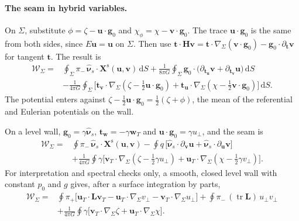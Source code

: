\documentclass[11pt]{article}
\theoremstyle{definition}
\theoremstyle{remark}
\newcommand{\bu}{\mathbf{u}}
\newcommand{\bv}{\mathbf{v}}
\newcommand{\bw}{\mathbf{w}}
\newcommand{\dS}{\,\mathrm{d}S}
\newcommand{\nuhs}{\hat{\boldsymbol{\nu}}_s}
\begin{document}
\paragraph{The seam in hybrid variables.} On $\Sigma$, substitute
$\phi = \zeta - \bu\cdot\mathbf g_0$ and $\chi_\phi = \chi -
\bv\cdot\mathbf g_0$. The trace $\bu\cdot\mathbf g_0$ is the same from
both sides, since $E\bu = \bu$ on $\Sigma$. Then use $\mathbf
t\cdot\mathbf H\bv = \mathbf t\cdot\nabla_\Sigma(\bv\cdot\mathbf g_0) -
\mathbf g_0\cdot\partial_{\mathbf t}\bv$ for tangent $\mathbf t$. The
result is
\begin{equation}
\begin{aligned}
  \mathcal W_\Sigma ={}& \oint_\Sigma\pi_-\,\nuhs\cdot\mathbf
  X^{\mathrm s}(\bu, \bv)\dS
  + \frac{1}{8\pi G}\oint_\Sigma\mathbf g_0\cdot\bigl(\partial_{\mathbf
  t_{\bu}}\bv + \partial_{\mathbf t_{\bv}}\bu\bigr)\dS \\
  &- \frac{1}{4\pi G}\oint_\Sigma\bigl[\mathbf t_{\bv}\cdot\nabla_\Sigma
  (\zeta - \tfrac12\bu\cdot\mathbf g_0) + \mathbf t_{\bu}\cdot
  \nabla_\Sigma(\chi - \tfrac12\bv\cdot\mathbf g_0)\bigr]\dS .
\end{aligned}
  \label{eq:seam}
\end{equation}
The potential enters against $\zeta - \tfrac12\bu\cdot\mathbf g_0 =
\tfrac12(\zeta + \phi)$, the mean of the referential and Eulerian
potentials on the wall.

On a level wall, $\mathbf g_0 = \gamma\nuhs$, $\mathbf t_{\bw} =
-\gamma\bw_T$ and $\bu\cdot\mathbf g_0 = \gamma u_\perp$, and the seam is
\begin{equation}
\begin{aligned}
  \mathcal W_\Sigma ={}& \oint\pi_-\,\nuhs\cdot\mathbf X^{\mathrm s}
  (\bu, \bv)
  - \oint q\,\bigl[\nuhs\cdot\partial_{\bv}\bu
     + \nuhs\cdot\partial_{\bu}\bv\bigr] \\
  &+ \frac{1}{4\pi G}\oint\gamma\bigl[\bv_T\cdot\nabla_\Sigma(\zeta -
  \tfrac12\gamma u_\perp) + \bu_T\cdot\nabla_\Sigma(\chi -
  \tfrac12\gamma v_\perp)\bigr] .
\end{aligned}
  \label{eq:seam-level}
\end{equation}
For interpretation and spectral checks only, a smooth, closed level
wall with constant $p_0$ and $g$ gives, after a surface integration by
parts,
\begin{equation*}
\begin{aligned}
  \mathcal W_\Sigma ={}& \oint\pi_+\bigl[\bu_T\cdot\mathbf L\bv_T -
  \bu_T\cdot\nabla_\Sigma v_\perp - \bv_T\cdot\nabla_\Sigma u_\perp\bigr]
  + \oint\pi_-\,(\operatorname{tr}\mathbf L)\,u_\perp v_\perp \\
  &+ \frac{1}{4\pi G}\oint\gamma\bigl[\bv_T\cdot\nabla_\Sigma\zeta +
  \bu_T\cdot\nabla_\Sigma\chi\bigr] .
\end{aligned}
\end{equation*}
\end{document}
